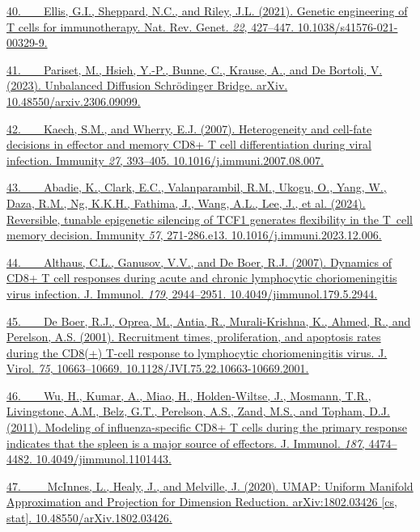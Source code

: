 \href{https://sciwheel.com/work/bibliography/10526050}{40.~  Ellis,
G.I., Sheppard, N.C., and Riley, J.L. (2021). Genetic engineering of T
cells for immunotherapy. Nat. Rev. Genet. \emph{22}, 427--447.
10.1038/s41576-021-00329-9.}

\href{https://sciwheel.com/work/bibliography/18537396}{41.~  Pariset,
M., Hsieh, Y.-P., Bunne, C., Krause, A., and De Bortoli, V. (2023).
Unbalanced Diffusion Schrödinger Bridge. arXiv.
10.48550/arxiv.2306.09099.}

\href{https://sciwheel.com/work/bibliography/770431}{42.~  Kaech, S.M.,
and Wherry, E.J. (2007). Heterogeneity and cell-fate decisions in
effector and memory CD8+ T cell differentiation during viral infection.
Immunity \emph{27}, 393--405. 10.1016/j.immuni.2007.08.007.}

\href{https://sciwheel.com/work/bibliography/15970531}{43.~  Abadie, K.,
Clark, E.C., Valanparambil, R.M., Ukogu, O., Yang, W., Daza, R.M., Ng,
K.K.H., Fathima, J., Wang, A.L., Lee, J., et al. (2024). Reversible,
tunable epigenetic silencing of TCF1 generates flexibility in the T~cell
memory decision. Immunity \emph{57}, 271-286.e13.
10.1016/j.immuni.2023.12.006.}

\href{https://sciwheel.com/work/bibliography/314516}{44.~  Althaus,
C.L., Ganusov, V.V., and De Boer, R.J. (2007). Dynamics of CD8+ T cell
responses during acute and chronic lymphocytic choriomeningitis virus
infection. J. Immunol. \emph{179}, 2944--2951.
10.4049/jimmunol.179.5.2944.}

\href{https://sciwheel.com/work/bibliography/424634}{45.~  De Boer,
R.J., Oprea, M., Antia, R., Murali-Krishna, K., Ahmed, R., and Perelson,
A.S. (2001). Recruitment times, proliferation, and apoptosis rates
during the CD8(+) T-cell response to lymphocytic choriomeningitis virus.
J. Virol. \emph{75}, 10663--10669. 10.1128/JVI.75.22.10663-10669.2001.}

\href{https://sciwheel.com/work/bibliography/8454326}{46.~  Wu, H.,
Kumar, A., Miao, H., Holden-Wiltse, J., Mosmann, T.R., Livingstone,
A.M., Belz, G.T., Perelson, A.S., Zand, M.S., and Topham, D.J. (2011).
Modeling of influenza-specific CD8+ T cells during the primary response
indicates that the spleen is a major source of effectors. J. Immunol.
\emph{187}, 4474--4482. 10.4049/jimmunol.1101443.}

\href{https://sciwheel.com/work/bibliography/18537601}{47.~   McInnes,
L., Healy, J., and Melville, J. (2020). UMAP: Uniform Manifold
Approximation and Projection for Dimension Reduction. arXiv:1802.03426
{[}cs, stat{]}. 10.48550/arXiv.1802.03426.}

